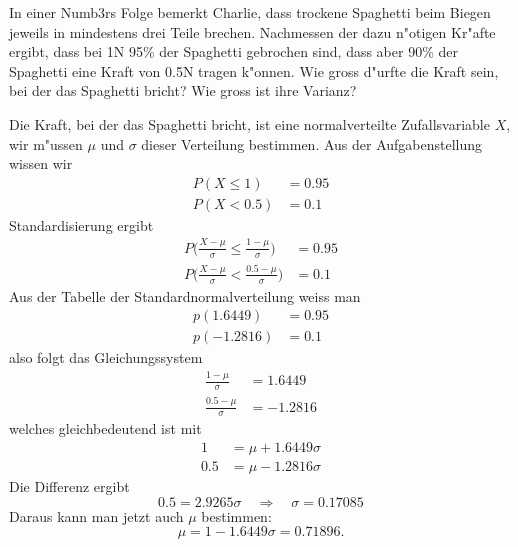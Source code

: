 In einer Numb3rs Folge bemerkt Charlie, dass trockene Spaghetti beim
Biegen jeweils
in mindestens drei Teile brechen. Nachmessen der dazu n"otigen Kr"afte
ergibt, dass bei 1N 95\% der Spaghetti gebrochen sind, dass aber 90\%
der Spaghetti eine Kraft von 0.5N tragen k"onnen. Wie gross d"urfte
die Kraft sein, bei der das Spaghetti bricht? Wie gross ist ihre Varianz?

\begin{loesung}
Die Kraft, bei der das Spaghetti bricht, ist eine normalverteilte
Zufallsvariable $X$, wir m"ussen $\mu$ und $\sigma$ dieser Verteilung
bestimmen. Aus der Aufgabenstellung wissen wir
\begin{align*}
P(X \le 1)&=0.95\\
P(X < 0.5)&=0.1
\end{align*}
Standardisierung ergibt
\begin{align*}
P\biggl(\frac{X-\mu}{\sigma} \le \frac{1-\mu}{\sigma}\biggr)&=0.95\\
P\biggl(\frac{X-\mu}{\sigma} < \frac{0.5-\mu}{\sigma}\biggr)&=0.1
\end{align*}
Aus der Tabelle der Standardnormalverteilung weiss man
\begin{align*}
p(1.6449)&=0.95\\
p(-1.2816)&=0.1
\end{align*}
also folgt das Gleichungssystem
\begin{align*}
\frac{1-\mu}{\sigma}&=1.6449\\
\frac{0.5-\mu}{\sigma}&=-1.2816
\end{align*}
welches gleichbedeutend ist mit
\begin{align*}
1&=\mu+1.6449\sigma\\
0.5&=\mu-1.2816\sigma
\end{align*}
Die Differenz ergibt
\[
0.5 = 2.9265\sigma\quad\Rightarrow\quad \sigma = 0.17085
\]
Daraus kann man jetzt auch $\mu$ bestimmen:
\[
\mu = 1-1.6449\sigma =  0.71896.
\]
\end{loesung}

